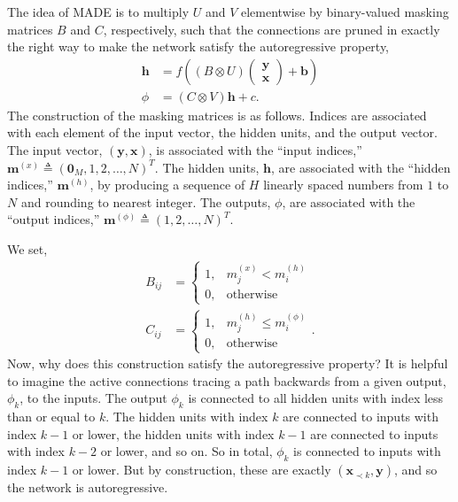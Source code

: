 The idea of MADE is to multiply $U$ and $V$ elementwise by binary-valued masking matrices $B$ and $C$, respectively, such that the connections are pruned in exactly the right way to make the network satisfy the autoregressive property,
\begin{align*}
	\mathbf{h} &= f\left((B\otimes U)\begin{pmatrix}\mathbf{y}\\\mathbf{x}\end{pmatrix} + \mathbf{b}\right)\\
	\phi &= (C\otimes V)\mathbf{h}+c.
\end{align*}
The construction of the masking matrices is as follows. Indices are associated with each element of the input vector, the hidden units, and the output vector. The input vector, $(\mathbf{y},\mathbf{x})$, is associated with the ``input indices,'' $\mathbf{m}^{(x)}\triangleq(\mathbf{0}_M,1,2,\ldots,N)^T$. The hidden units, $\mathbf{h}$, are associated with the ``hidden indices,'' $\mathbf{m}^{(h)}$, by producing a sequence of $H$ linearly spaced numbers from $1$ to $N$ and rounding to nearest integer. The outputs, $\phi$, are associated with the ``output indices,'' $\mathbf{m}^{(\phi)}\triangleq(1,2,\ldots,N)^T$.

We set,
\begin{align*}
	B_{ij} &= \begin{cases}
							1, & m^{(x)}_j<m^{(h)}_i\\
							0, & \text{otherwise}
            \end{cases}\\
	C_{ij} &= \begin{cases}
							1, & m^{(h)}_j\le m^{(\phi)}_i\\
							0, & \text{otherwise}
            \end{cases}.
\end{align*}
Now, why does this construction satisfy the autoregressive property? It is helpful to imagine the active connections tracing a path backwards from a given output, $\phi_k$, to the inputs. The output $\phi_k$ is connected to all hidden units with index less than or equal to $k$. The hidden units with index $k$ are connected to inputs with index $k-1$ or lower, the hidden units with index $k-1$ are connected to inputs with index $k-2$ or lower, and so on. So in total, $\phi_k$ is connected to inputs with index $k-1$ or lower. But by construction, these are exactly $(\mathbf{x}_{\prec k},\mathbf{y})$, and so the network is autoregressive.

